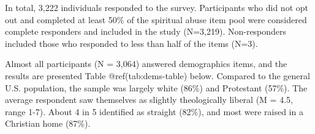 \documentclass[
  letterpaper,
  DIV=11,
  numbers=noendperiod]{scrreport}
\begin{document}
In total, 3,222 individuals responded to the survey. Participants who
did not opt out and completed at least 50\% of the spiritual abuse item
pool were considered complete responders and included in the study
(N=3,219). Non-responders included those who responded to less than half
of the items (N=3).

Almost all participants (N = 3,064) answered demographics items, and the
results are presented Table @ref(tab:dems-table) below. Compared to the
general U.S. population, the sample was largely white (86\%) and
Protestant (57\%). The average respondent saw themselves as slightly
theologically liberal (M = 4.5, range 1-7). About 4 in 5 identified as
straight (82\%), and most were raised in a Christian home (87\%).

\begin{table}[!h]


\end{table}
\end{document}
